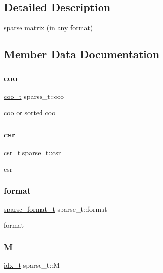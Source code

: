 \subsection{Detailed Description}
sparse matrix (in any format) 

\subsection{Member Data Documentation}
\mbox{\label{structsparse__t_ad0391f2782f49ea2eb248ed255e9d732}} 
\subsubsection{\texorpdfstring{coo}{coo}}
{\footnotesize\ttfamily \hyperlink{structcoo__t}{coo\+\_\+t} sparse\+\_\+t\+::coo}

coo or sorted coo \mbox{\label{structsparse__t_a68a71613181b0380d0d4d871236b2521}} 
\subsubsection{\texorpdfstring{csr}{csr}}
{\footnotesize\ttfamily \hyperlink{structcsr__t}{csr\+\_\+t} sparse\+\_\+t\+::csr}

csr \mbox{\label{structsparse__t_a1bb9e61c965f9ea814aab21f7ff77a73}} 
\subsubsection{\texorpdfstring{format}{format}}
{\footnotesize\ttfamily \hyperlink{spmv_8cc_a8c0094893526c01b430903b2d9227256}{sparse\+\_\+format\+\_\+t} sparse\+\_\+t\+::format}

format \mbox{\label{structsparse__t_a8a08bd7a16c76180afccf05e28f72a93}} 
\subsubsection{\texorpdfstring{M}{M}}
{\footnotesize\ttfamily \hyperlink{spmv_8cc_a8e93478a00e685bea5e6a3f617bf03a3}{idx\+\_\+t} sparse\+\_\+t\+::M}

